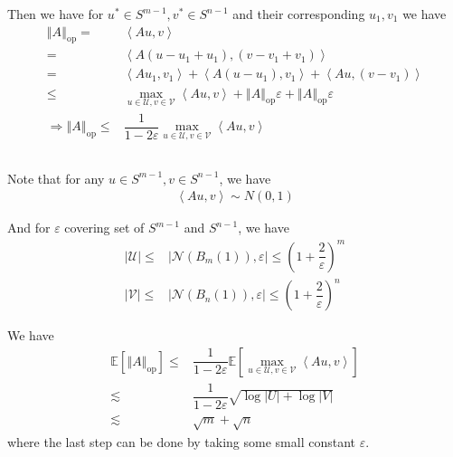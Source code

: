 \documentclass[11pt,a4paper]{ctexart}
\numberwithin{equation}{section}%
\begin{document}
Then we have for $ u^*\in S^{m-1},v^*\in S^{n-1} $ and their corresponding $ u_1,v_1 $ we have
\begin{align*}
    \left\Vert A \right\Vert _\mathrm{ op } =& \left\langle Au,v \right\rangle \\
    =& \left\langle A(u-u_1+u_1), (v-v_1+v_1) \right\rangle \\
    =& \left\langle Au_1, v_1 \right\rangle + \left\langle A(u-u_1), v_1 \right\rangle + \left\langle Au, (v-v_1) \right\rangle \\
    \leq & \mathop{ \max }\limits_{u\in \mathcal{U},v\in \mathcal{V}}\left\langle Au, v \right\rangle + \left\Vert A \right\Vert _\mathrm{ op }\varepsilon  + \left\Vert A \right\Vert _\mathrm{ op }\varepsilon\\
     \Rightarrow  \left\Vert A \right\Vert _\mathrm{ op }\leq & \dfrac{ 1 }{ 1-2\varepsilon  }  \mathop{ \max }\limits_{u\in \mathcal{U},v\in \mathcal{V}}\left\langle Au, v \right\rangle
\end{align*}


\subsection{}

Note that for any $ u\in S^{m-1},v\in S^{n-1} $, we have
\begin{align*}
    \left\langle Au,v \right\rangle \sim N(0,1)  
\end{align*}

And for $ \varepsilon  $ covering set of $ S^{m-1} $ and $ S^{n-1} $, we have
\begin{align*}
    \left\vert \mathcal{U } \right\vert \leq &  \left\vert \mathcal{N}(B_m(1)), \varepsilon  \right\vert \leq \left( 1 + \dfrac{ 2 }{ \varepsilon  } \right)^m \\
    \left\vert \mathcal{V } \right\vert \leq &  \left\vert \mathcal{N}(B_n(1)), \varepsilon  \right\vert \leq \left( 1 + \dfrac{ 2 }{ \varepsilon  } \right)^n
\end{align*}

We have
\begin{align*}
    \mathbb{E}\left[ \left\Vert A \right\Vert _\mathrm{ op } \right] \leq & \dfrac{ 1 }{ 1-2\varepsilon  }  \mathbb{E}\left[ \mathop{ \max }\limits_{u\in \mathcal{U},v\in \mathcal{V}}\left\langle Au, v \right\rangle \right] \\ 
    \lesssim &\dfrac{ 1 }{ 1-2\varepsilon  }\sqrt{\log \left\vert U \right\vert + \log \left\vert V \right\vert } \\
    \lesssim &\sqrt{m} + \sqrt{n}
\end{align*}
where the last step can be done by taking some small constant $ \varepsilon  $.
\end{document}
